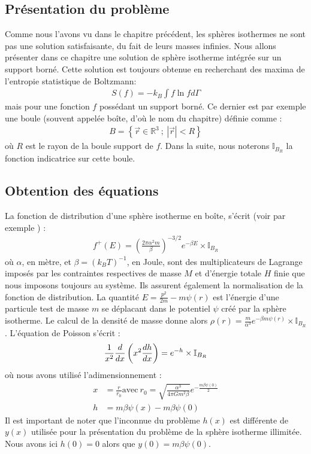 \subsection{Présentation du problème}
	Comme nous l'avons vu dans le chapitre précédent, les sphères isothermes ne sont pas une solution satisfaisante, du fait de leurs masses infinies.
	Nous allons présenter dans ce chapitre une solution de sphère isotherme intégrée sur un support borné. Cette solution est toujours obtenue en recherchant des maxima  de l'entropie statistique de Boltzmann:
	\begin{align*}
		S(f) = - k_B \int f \ln f d\Gamma
	\end{align*}
	mais pour une fonction $f$ possédant un support borné. Ce dernier est par exemple une boule (souvent appelée boîte, d'où le nom du chapitre) définie comme :
	\begin{align}
		B = \left\{ \vec{r} \in \mathbb{R}^3\ ;\ \left|\vec{r}\right| < R\right\}
	\end{align}
	où $R$ est le rayon de la boule support de $f$. Dans la suite, nous noterons $\mathbb{I}_{B_R}$ la fonction indicatrice sur cette boule.

\subsection{Obtention des équations}
	La fonction de distribution d'une sphère isotherme en boîte, s'écrit (voir par exemple \cite{CoursJP}) :
	\begin{align}
		f^+(E) = \left(\frac{2\pi\alpha^2m}{\beta}\right)^{-3/2}e^{-\beta E}\times\mathbb{I}_{B_R}
	\end{align}
	où $\alpha$, en mètre, et $\beta=(k_B T)^{-1}$, en Joule, sont des multiplicateurs de Lagrange imposés
	par les contraintes respectives de masse $M$ et d'énergie totale $H$ finie que nous imposons toujours au système.
	Ils assurent également la normalisation de la fonction de distribution.
	La quantité \mbox{$E = \frac{p^2}{2m} - m\psi(r)$} est l'énergie d'une particule test de masse $m$ se déplacant dans
	le potentiel $\psi$ créé par la sphère isotherme.
	Le calcul de la densité de masse donne alors \mbox{$\rho(r) = \frac{m}{\alpha^3}e^{-\beta m \psi(r)}\times\mathbb{I}_{B_R}$}. %
	L'équation de Poisson s'écrit :
	\begin{align}
		 \frac{1}{x^2}\frac{d}{dx}\left(x^2\frac{d h}{dx}\right) = e^{-h} \times\mathbb{I}_{B_R} \notag
	\end{align}
	où nous avons utilisé l'adimensionnement  :
	\begin{align}
		x &= \frac{r}{r_0}\mathrm{ avec }\ r_0 = \sqrt{\frac{\alpha^3}{4\pi G m^2\beta}}e^{-\frac{m\beta\psi(0)}{2}} \label{toto11} \\
		h &= m\beta\psi(x) - m\beta\psi(0) \label{toto12}
		\end{align}
		Il est important de noter que l'inconnue du problème $h(x)$ est différente de $y(x)$ utilisée pour la présentation du problème de la sphère isotherme illimitée. Nous avons ici $h(0) = 0$ alors que $y(0) = m\beta\psi(0)$.
		
